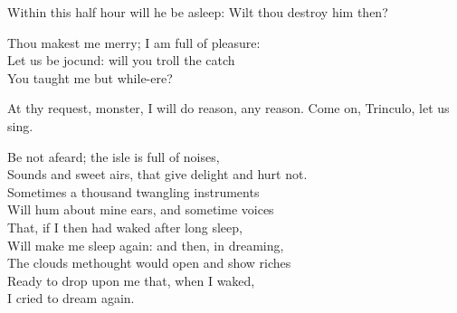 
\begin{verse_speech}[Caliban] 
Within this half hour will he be asleep:
Wilt thou destroy him then?
\end{verse_speech}



\begin{verse_speech}[Caliban] 
Thou makest me merry; I am full of pleasure:\\
Let us be jocund: will you troll the catch\\
You taught me but while-ere?
\end{verse_speech}

\begin{verse_speech}[Stephano] At thy request, monster, I will do reason, any
reason. Come on, Trinculo, let us sing.
\begin{song}
\end{song}
\end{verse_speech}

	








\begin{verse_speech}[Caliban] 
Be not afeard; the isle is full of noises,\\
Sounds and sweet airs, that give delight and hurt not.\\
Sometimes a thousand twangling instruments\\
Will hum about mine ears, and sometime voices\\
That, if I then had waked after long sleep,\\
Will make me sleep again: and then, in dreaming,\\
The clouds methought would open and show riches\\
Ready to drop upon me that, when I waked,\\
I cried to dream again.
\end{verse_speech}


